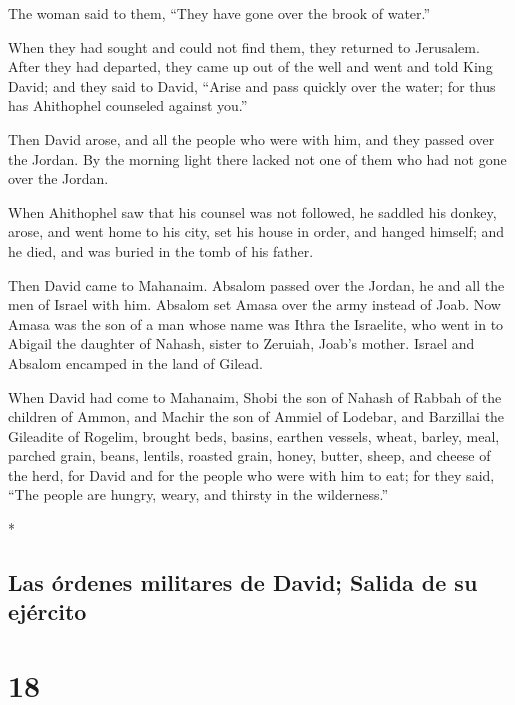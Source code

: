 \begin{paracol}{2}
\begin{otherlanguage}{english}
The woman said to them, ``They have gone over the brook of water.''

When they had sought and could not find them, they returned to
Jerusalem.  After they had departed, they came up out of
the well and went and told King David; and they said to David, ``Arise
and pass quickly over the water; for thus has Ahithophel counseled
against you.''

 Then David arose, and all the people who were with him,
and they passed over the Jordan. By the morning light there lacked not
one of them who had not gone over the Jordan.

 When Ahithophel saw that his counsel was not followed,
he saddled his donkey, arose, and went home to his city, set his house
in order, and hanged himself; and he died, and was buried in the tomb of
his father.

 Then David came to Mahanaim. Absalom passed over the
Jordan, he and all the men of Israel with him.  Absalom
set Amasa over the army instead of Joab. Now Amasa was the son of a man
whose name was Ithra the Israelite, who went in to Abigail the daughter
of Nahash, sister to Zeruiah, Joab's mother.  Israel and
Absalom encamped in the land of Gilead.

 When David had come to Mahanaim, Shobi the son of Nahash
of Rabbah of the children of Ammon, and Machir the son of Ammiel of
Lodebar, and Barzillai the Gileadite of Rogelim,  brought
beds, basins, earthen vessels, wheat, barley, meal, parched grain,
beans, lentils, roasted grain,  honey, butter, sheep, and
cheese of the herd, for David and for the people who were with him to
eat; for they said, ``The people are hungry, weary, and thirsty in the
wilderness.''

\end{otherlanguage}

\switchcolumn[0]*

\hypertarget{las-uxf3rdenes-militares-de-david-salida-de-su-ejuxe9rcito}{%
\subsection{Las órdenes militares de David; Salida de su
ejército}\label{las-uxf3rdenes-militares-de-david-salida-de-su-ejuxe9rcito}}

\hypertarget{section-34}{%
\section{18}\label{section-34}}


\end{paracol}
